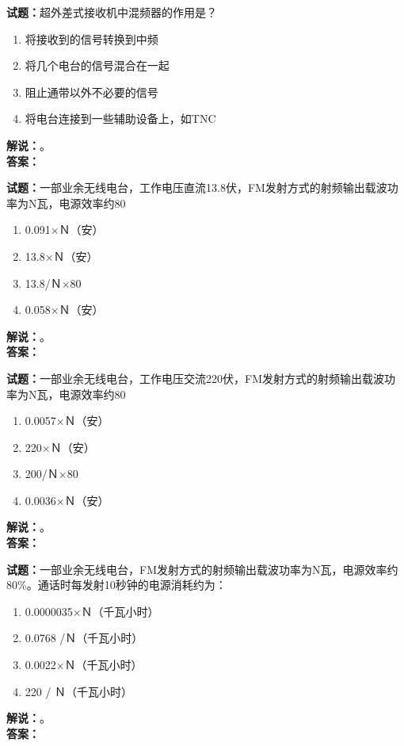\documentclass{ctexbook}
\begin{document}
\bigskip




\noindent\textbf{试题：}超外差式接收机中混频器的作用是？
\begin{enumerate}[leftmargin=3em]
\item 将接收到的信号转换到中频
\item 将几个电台的信号混合在一起
\item 阻止通带以外不必要的信号
\item 将电台连接到一些辅助设备上，如TNC
\end{enumerate}
\noindent\textbf{解说：}\textbf{}。\\\noindent\textbf{答案：}

\bigskip




\noindent\textbf{试题：}一部业余无线电台，工作电压直流13.8伏，FM发射方式的射频输出载波功率为N瓦，电源效率约80%
\begin{enumerate}[leftmargin=3em]
\item 0.091×Ｎ（安）
\item 13.8×Ｎ（安）
\item 13.8/Ｎ×80%
\item 0.058×Ｎ（安）
\end{enumerate}
\noindent\textbf{解说：}\textbf{}。\\\noindent\textbf{答案：}

\bigskip




\noindent\textbf{试题：}一部业余无线电台，工作电压交流220伏，FM发射方式的射频输出载波功率为N瓦，电源效率约80%
\begin{enumerate}[leftmargin=3em]
\item 0.0057×Ｎ（安）
\item 220×Ｎ（安）
\item 200/Ｎ×80%
\item 0.0036×Ｎ（安）
\end{enumerate}
\noindent\textbf{解说：}\textbf{}。\\\noindent\textbf{答案：}

\bigskip




\noindent\textbf{试题：}一部业余无线电台，FM发射方式的射频输出载波功率为N瓦，电源效率约80\%。通话时每发射10秒钟的电源消耗约为：
\begin{enumerate}[leftmargin=3em]
\item 0.0000035×Ｎ（千瓦小时）
\item 0.0768 /Ｎ（千瓦小时）
\item 0.0022×Ｎ（千瓦小时）
\item 220 / Ｎ（千瓦小时）
\end{enumerate}
\noindent\textbf{解说：}\textbf{}。\\\noindent\textbf{答案：}
\end{document}
